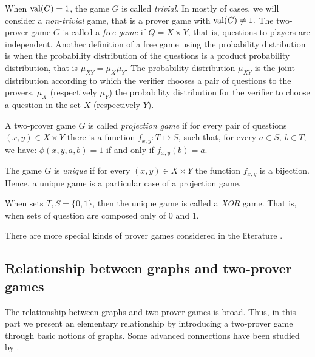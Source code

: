 When $\mathrm{val} (G)=1$, the game $G$ is called \textit{trivial}. In mostly of cases, we will consider a \textit{non-trivial} game, 
that is a prover game with $\mathrm{val} (G) \neq 1.$
The two-prover game $G$ is called a \textit{free game} if $Q=X \times Y$, that is, questions to players are  independent. Another definition of a free game using the probability distribution 
is when  the probability  distribution of the questions is a product probability  distribution, that is $\mu_{XY}=\mu_X \mu_Y.$
The probability distribution $\mu_{XY}$ is  the joint distribution according to which the verifier chooses a pair of questions to the provers. $\mu_X$ (respectively  $\mu_Y$) the probability distribution for the verifier to choose a question in the set $X$ (respectively $Y$).

A two-prover game $G$ is called \textit{projection game} if for every pair of questions $(x,y) \in X \times Y$ there is a function $f_{x,y}: T \longmapsto S$, such that, for every $a\in S, \ b\in T$, we have: $\phi(x,y,a,b)=1$ if and only if $f_{x,y}(b)=a.$ 

The game $G$ is \textit{unique} if for every $(x,y) \in X \times Y$ the function $f_{x,y}$ is a bijection. Hence, a unique game is a particular case of a projection game. 

When sets $T, S = \{0, 1\}$, then the unique game is called a \textit{XOR} game. That is, when sets of question are composed only of $0$ and $1.$

There are more special kinds of prover games considered in the literature \citep*{verbitsky1996towards, cleve2007perfect, raz2010parallel, rao2011parallel, moshkovitz2014parallel, tamaki2015parallel, bavarian2015anchoring, dinur2016multiplayer, hkazla2016forbidden}.

\subsection{Relationship between graphs and two-prover games} \label{expander}

The relationship between graphs and two-prover games is broad. Thus, in this part we present an elementary  relationship by introducing a two-prover game through basic notions of graphs. Some advanced connections have been studied by
\cite*{laekhanukit2014parameters,tamaki2015parallel,dinur2016multiplayer}.

